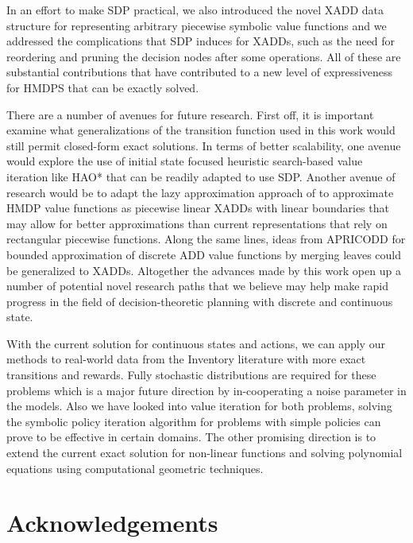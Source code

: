 \documentclass[twoside,11pt]{article}
\begin{document}
In an effort to make SDP practical, we also introduced
the novel XADD data structure for representing arbitrary piecewise
symbolic value functions and we addressed the complications that
SDP induces for XADDs, such as the need for reordering and pruning the decision
nodes after some operations.  All of these are substantial contributions
that have contributed to a new level of expressiveness for HMDPS
that can be exactly solved.

There are a number of avenues for future research.  First off, it is
important examine what generalizations of the transition function used
in this work would still permit closed-form exact solutions.  In terms
of better scalability, one avenue would explore the use of initial
state focused heuristic search-based value iteration like
HAO* \cite{hao09} that can be readily adapted to use SDP.  Another
avenue of research would be to adapt the lazy approximation approach
of \cite{li05} to approximate HMDP value functions as piecewise
linear XADDs with linear boundaries that may allow for better
approximations than current representations that rely on rectangular
piecewise functions.  Along the same lines, ideas from
APRICODD \cite{apricodd} for bounded approximation of discrete ADD
value functions by merging leaves could be generalized to XADDs.
Altogether the advances made by this work open up a number of
potential novel research paths that we believe may help make
rapid progress in the field of decision-theoretic planning
with discrete and continuous state.

With the current solution for continuous states and actions, we can apply our methods to real-world data from the Inventory literature with more exact transitions and rewards. Fully stochastic distributions are required for these problems which is a major future direction by in-cooperating a noise parameter in the models. 
Also we have looked into value iteration for both problems, solving the symbolic policy iteration algorithm for problems with simple policies can prove to be effective in certain domains. 
The other promising direction is to extend the current exact solution for non-linear functions and solving polynomial equations using computational geometric techniques. 


\section*{Acknowledgements}


\vskip 0.2in


\end{document}
